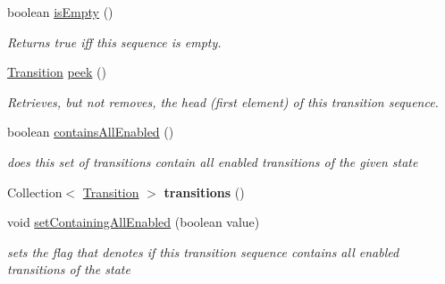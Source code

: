 \begin{DoxyCompactItemize}
boolean \hyperlink{interfaceedu_1_1udel_1_1cis_1_1vsl_1_1civl_1_1semantics_1_1IF_1_1TransitionSequence_ab3ee95eaf10a4934d8120d3670c41770}{is\+Empty} ()
\begin{DoxyCompactList}\small\item\em Returns true iff this sequence is empty. \end{DoxyCompactList}\item 
\hyperlink{interfaceedu_1_1udel_1_1cis_1_1vsl_1_1civl_1_1semantics_1_1IF_1_1Transition}{Transition} \hyperlink{interfaceedu_1_1udel_1_1cis_1_1vsl_1_1civl_1_1semantics_1_1IF_1_1TransitionSequence_a58efc76c64112ac055ed8e20cd40760c}{peek} ()
\begin{DoxyCompactList}\small\item\em Retrieves, but not removes, the head (first element) of this transition sequence. \end{DoxyCompactList}\item 
boolean \hyperlink{interfaceedu_1_1udel_1_1cis_1_1vsl_1_1civl_1_1semantics_1_1IF_1_1TransitionSequence_a070009777e79c18f146997bfcd7185f1}{contains\+All\+Enabled} ()
\begin{DoxyCompactList}\small\item\em does this set of transitions contain all enabled transitions of the given state \end{DoxyCompactList}\item 
\hypertarget{interfaceedu_1_1udel_1_1cis_1_1vsl_1_1civl_1_1semantics_1_1IF_1_1TransitionSequence_ac51145dd0e0237e07380a387d7cecb27}{}Collection$<$ \hyperlink{interfaceedu_1_1udel_1_1cis_1_1vsl_1_1civl_1_1semantics_1_1IF_1_1Transition}{Transition} $>$ {\bfseries transitions} ()\label{interfaceedu_1_1udel_1_1cis_1_1vsl_1_1civl_1_1semantics_1_1IF_1_1TransitionSequence_ac51145dd0e0237e07380a387d7cecb27}

\item 
\hypertarget{interfaceedu_1_1udel_1_1cis_1_1vsl_1_1civl_1_1semantics_1_1IF_1_1TransitionSequence_a7e1babc0a15dc7576b9d46060da62292}{}void \hyperlink{interfaceedu_1_1udel_1_1cis_1_1vsl_1_1civl_1_1semantics_1_1IF_1_1TransitionSequence_a7e1babc0a15dc7576b9d46060da62292}{set\+Containing\+All\+Enabled} (boolean value)\label{interfaceedu_1_1udel_1_1cis_1_1vsl_1_1civl_1_1semantics_1_1IF_1_1TransitionSequence_a7e1babc0a15dc7576b9d46060da62292}

\begin{DoxyCompactList}\small\item\em sets the flag that denotes if this transition sequence contains all enabled transitions of the state \end{DoxyCompactList}\end{DoxyCompactItemize}


